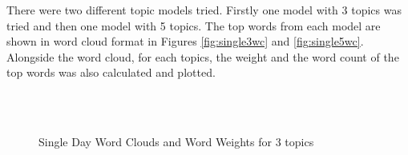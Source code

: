 There were two different topic models tried. Firstly one model with 3 topics was tried and then one model with 5 topics. The top words from each model are shown in word cloud format in Figures \ref{fig:single3wc} and \ref{fig:single5wc}. Alongside the word cloud, for each topics, the weight and the word count of the top words was also calculated and plotted. 
	
\begin{figure}[H]
	\centering
	\\
	\\
	
	\caption{Single Day Word Clouds and Word Weights for 3 topics}
	\label{fig:single3}
\end{figure}

